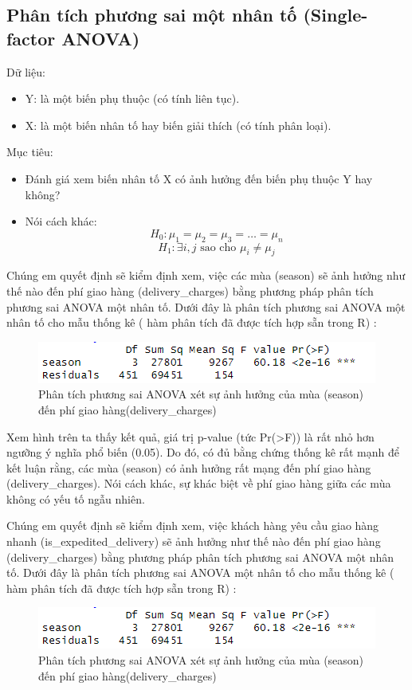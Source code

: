 \subsection{Phân tích phương sai một nhân tố (Single-factor ANOVA)}

Dữ liệu:
\begin{itemize}
    \item Y: là một biến phụ thuộc (có tính liên tục).
    \item X: là một biến nhân tố hay biến giải thích (có tính phân loại).
\end{itemize}
Mục tiêu:
\begin{itemize}
    \item Đánh giá xem biến nhân tố X có ảnh hưởng đến biến phụ thuộc Y hay không?
    \item Nói cách khác:
    \[
        H_{0}: \mu_{1} = \mu_{2} = \mu_{3} = \dots = \mu_{n}
        \]
        \[
        H_{1}: \exists i, j \text{ sao cho } \mu_{i} \neq \mu_{j}
        \]
\end{itemize}
Chúng em quyết định sẽ kiểm định xem, việc các mùa (season) sẽ ảnh hưởng như thế nào đến phí giao hàng (delivery\_charges) bằng phương pháp phân tích phương sai ANOVA một nhân tố. Dưới đây là phân tích phương sai ANOVA một nhân tố cho mẫu thống kê ( hàm phân tích đã được tích hợp sẵn trong R) :

\begin{figure}[!htbp]
    \centering
    \includegraphics[width=0.4\linewidth]{graphics/5.3.1.png}
    \caption{Phân tích phương sai ANOVA xét sự ảnh hưởng của mùa (season) đến phí giao hàng(delivery\_charges)}
\end{figure}

Xem hình trên ta thấy kết quả, giá trị p-value (tức Pr(>F)) là rất nhỏ hơn ngưỡng ý nghĩa phổ biến (0.05). Do đó, có đủ bằng chứng thống kê rất mạnh để kết luận rằng, các mùa (season) có ảnh hưởng rất mạng đến phí giao hàng (delivery\_charges). Nói cách khác, sự khác biệt về phí giao hàng giữa các mùa không có yếu tố ngẫu nhiên.


Chúng em quyết định sẽ kiểm định xem, việc khách hàng yêu cầu giao hàng nhanh (is\_expedited\_delivery) sẽ ảnh hưởng như thế nào đến phí giao hàng (delivery\_charges) bằng phương pháp phân tích phương sai ANOVA một nhân tố. Dưới đây là phân tích phương sai ANOVA một nhân tố cho mẫu thống kê ( hàm phân tích đã được tích hợp sẵn trong R) :
\begin{figure}[!htbp]
    \centering
    \includegraphics[width=0.4\linewidth]{graphics/5.3.1.png}
    \caption{Phân tích phương sai ANOVA xét sự ảnh hưởng của mùa (season) đến phí giao hàng(delivery\_charges)}
\end{figure}
